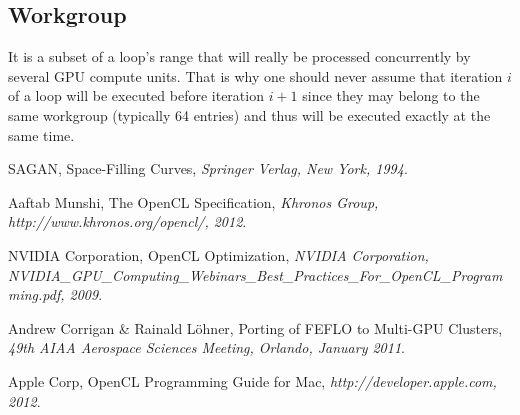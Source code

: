 \documentclass[a4paper,12pt]{article}
\begin{document}
\subsection{Workgroup}
It is a subset of a loop's range that will really be processed concurrently by several GPU compute units. That is why one should never assume that iteration $i$ of a loop will be executed before iteration $i+1$ since they may belong to the same workgroup (typically 64 entries) and thus will be executed exactly at the same time.


%
%


\begin{thebibliography}{99}
\small

	SAGAN,
	Space-Filling Curves,
	\emph{Springer Verlag, New York, 1994}.

	Aaftab Munshi,
	The OpenCL Specification,
	\emph{Khronos Group, http://www.khronos.org/opencl/, 2012}.

	NVIDIA Corporation,
	OpenCL Optimization,
	\emph{NVIDIA Corporation, NVIDIA\_GPU\_Computing\_Webinars\_Best\_Practices\_For\_OpenCL\_Programming.pdf, 2009}.

	Andrew Corrigan \& Rainald Löhner,
	Porting of FEFLO to Multi-GPU Clusters,
	\emph{49th AIAA Aerospace Sciences Meeting, Orlando, January 2011}.

	Apple Corp,
	OpenCL Programming Guide for Mac,
	\emph{http://developer.apple.com, 2012}.



\end{thebibliography}
\end{document}
